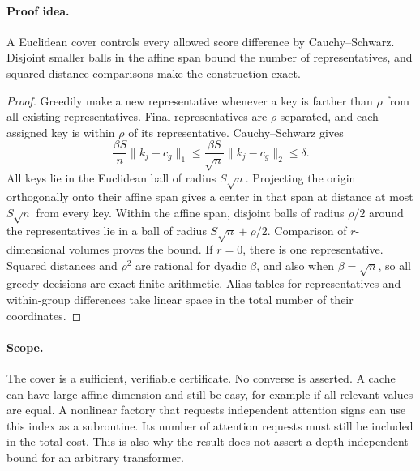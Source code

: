 \paragraph{Proof idea.}
A Euclidean cover controls every allowed score difference by Cauchy--Schwarz.  Disjoint smaller balls in the affine span bound the number of representatives, and squared-distance comparisons make the construction exact.

\begin{proof}
Greedily make a new representative whenever a key is farther than
$\rho$ from all existing representatives. Final representatives
are $\rho$-separated, and each assigned key is within $\rho$ of
its representative. Cauchy--Schwarz gives
\[
 \frac{\beta S}{n}\|k_j-c_g\|_1
 \le\frac{\beta S}{\sqrt n}\|k_j-c_g\|_2\le\delta.
\]
All keys lie in the Euclidean ball of radius $S\sqrt n$. Projecting
the origin orthogonally onto their affine span gives a center in
that span at distance at most $S\sqrt n$ from every key. Within
the affine span, disjoint balls of radius $\rho/2$ around the
representatives lie in a ball of radius $S\sqrt n+\rho/2$.
Comparison of $r$-dimensional volumes proves the bound. If $r=0$,
there is one representative. Squared distances and $\rho^2$ are
rational for dyadic $\beta$, and also when $\beta=\sqrt n$, so
all greedy decisions are exact finite arithmetic. Alias tables for
representatives and within-group differences take linear space in
the total number of their coordinates.
\end{proof}

\paragraph{Scope.}
The cover is a sufficient, verifiable certificate. No converse is
asserted. A cache can have large affine dimension and still be easy,
for example if all relevant values are equal. A nonlinear factory
that requests independent attention signs can use this index as a
subroutine. Its number of attention requests must still be included
in the total cost. This is also why the result does not assert a
depth-independent bound for an arbitrary transformer.
